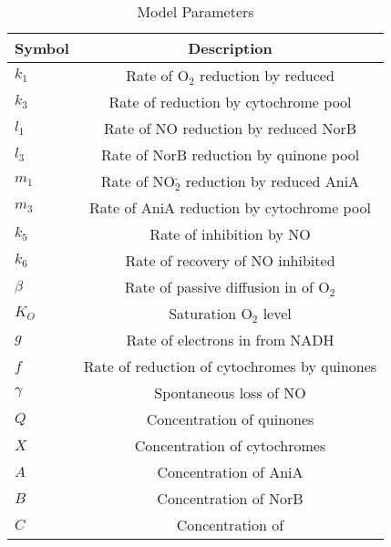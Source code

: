 \begin{table}[ht]
\begin{center}
\begin{tabular}{l c}
\toprule
\textbf{Symbol} & \textbf{Description}\\
\midrule
$k_1$ & Rate of O$_{\textrm{2}}$ reduction by reduced \cbbthree{}\\
$k_3$ & Rate of \cbbthree{} reduction by cytochrome pool\\ 
$l_1$ & Rate of NO reduction by reduced NorB\\
$l_3$ & Rate of NorB reduction by quinone pool\\
$m_1$ & Rate of NO$_{\textrm{2}}^{\textrm{-}}$ reduction by reduced AniA\\
$m_3$ & Rate of AniA reduction by cytochrome pool\\
$k_5$ & Rate of \cbbthree{} inhibition by NO\\
$k_6$ & Rate of recovery of NO inhibited \cbbthree{}\\
$\beta$ & Rate of passive diffusion in of O$_{\textrm{2}}$\\
$K_O$ & Saturation O$_{\textrm{2}}$ level\\
$g$ & Rate of electrons in from NADH\\
$f$ & Rate of reduction of cytochromes by quinones\\
$\gamma$ & Spontaneous loss of NO\\
$Q$ & Concentration of quinones\\
$X$ & Concentration of cytochromes\\   
$A$ & Concentration of AniA\\
$B$ & Concentration of NorB\\
$C$ & Concentration of \cbbthree{}\\
\bottomrule
\end{tabular}
\caption{Model Parameters
\label{ps}}
\end{center}
\end{table}